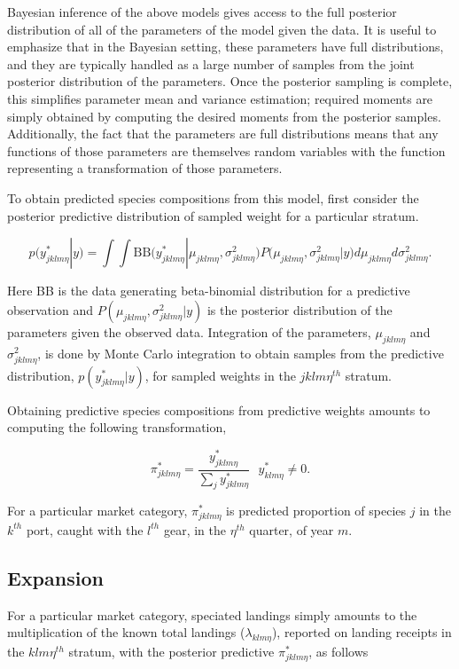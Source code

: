 \documentclass[12pt]{article}
\begin{document}
Bayesian inference of the above models gives access to the full
posterior distribution of all of the parameters of the model given the
data. It is useful to emphasize that in the Bayesian setting, these
parameters have full distributions, and they are typically handled as a
large number of samples from the joint posterior distribution of the
parameters. Once the posterior sampling is complete, this simplifies
parameter mean and variance estimation; required moments are simply
obtained by computing the desired moments from the posterior samples.
Additionally, the fact that the parameters are full distributions means
that any functions of those parameters are themselves random variables
with the function representing a transformation of those parameters.

To obtain predicted species compositions from this model, first consider
the posterior predictive distribution of sampled weight for a particular
stratum.

\[p(y^*_{jklm\eta}|y) = \int\!\!\!\!\int\! \text{BB}\Big( y^*_{jklm\eta}|\mu_{jklm\eta}, \sigma^2_{jklm\eta} \Big) P\Big(\mu_{jklm\eta}, \sigma^2_{jklm\eta} | y\Big) d\mu_{jklm\eta} d\sigma^2_{jklm\eta}.\]

Here BB is the data generating beta-binomial distribution for a
predictive observation and \(P(\mu_{jklm\eta}, \sigma^2_{jklm\eta}|y)\)
is the posterior distribution of the parameters given the observed data.
Integration of the parameters, \(\mu_{jklm\eta}\) and
\(\sigma^2_{jklm\eta}\), is done by Monte Carlo integration to obtain
samples from the predictive distribution, \(p(y^*_{jklm\eta}|y)\), for
sampled weights in the \(jklm\eta^{th}\) stratum.

Obtaining predictive species compositions from predictive weights
amounts to computing the following transformation,

\[\pi^*_{jklm\eta} = \frac{y^*_{jklm\eta}}{\sum_j y^*_{jklm\eta}} ~~~ y^*_{klm\eta}\neq 0.\]

For a particular market category, \(\pi^*_{jklm\eta}\) is predicted
proportion of species \(j\) in the \(k^{th}\) port, caught with the
\(l^{th}\) gear, in the \(\eta^{th}\) quarter, of year \(m\).

\subsection{Expansion}\label{expansion}

For a particular market category, speciated landings simply amounts to
the multiplication of the known total landings (\(\lambda_{klm\eta}\)),
reported on landing receipts in the \(klm\eta^{th}\) stratum, with the
posterior predictive \(\pi^*_{jklm\eta}\), as follows
\end{document}
